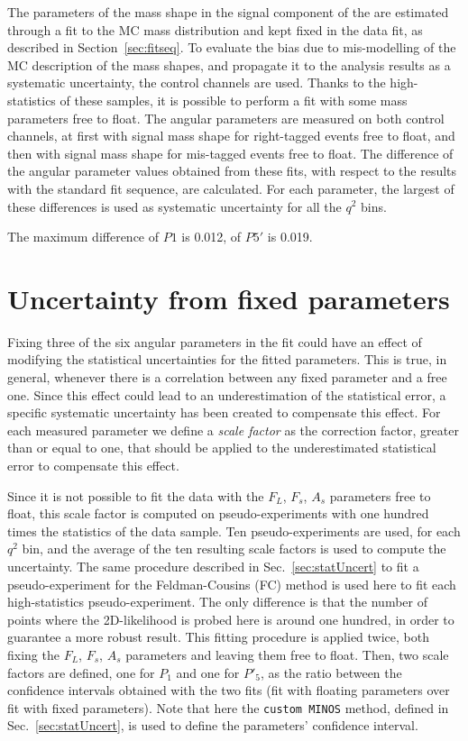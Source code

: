 The parameters of the mass shape in the signal component of the \pdf are estimated through a fit to the MC mass distribution and kept fixed in the data fit, as described in Section~\ref{sec:fitseq}.
To evaluate the bias due to mis-modelling of the MC description of the mass shapes, and propagate it to the analysis results as a systematic uncertainty, the control channels are used.
Thanks to the high-statistics of these samples, it is possible to perform a fit with some mass parameters free to float.
The angular parameters are measured on both control channels, at first with signal mass shape for right-tagged events free to float, and then with signal mass shape for mis-tagged events free to float.
The difference of the angular parameter values obtained from these fits, with respect to the results with the standard fit sequence, are calculated.
For each parameter, the largest of these differences is used as systematic uncertainty for all the $q^2$ bins.

The maximum difference of $P1$ is 0.012, of $P5'$ is 0.019.

\section{Uncertainty from fixed \pdf parameters}
\label{sec:sys-fixedparm}

Fixing three of the six angular parameters in the fit could have an effect of modifying the statistical uncertainties for the fitted parameters.
This is true, in general, whenever there is a correlation between any fixed parameter and a free one.
Since this effect could lead to an underestimation of the statistical error, a specific systematic uncertainty has been created to compensate this effect.
For each measured parameter we define a \textit{scale factor} as the correction factor, greater than or equal to one, that should be applied to the underestimated statistical error to compensate this effect. 


Since it is not possible to fit the data with the $F_L$, $F_s$, $A_s$ parameters free to float, this scale factor is computed on pseudo-experiments with one hundred times the statistics of the data sample.
Ten pseudo-experiments are used, for each $q^2$ bin, and the average of the ten resulting scale factors is used to compute the uncertainty.
The same procedure described in Sec.~\ref{sec:statUncert} to fit a pseudo-experiment for the Feldman-Cousins (FC) method is used here to fit each high-statistics pseudo-experiment.
The only difference is that the number of points where the 2D-likelihood is probed here is around one hundred, in order to guarantee a more robust result.
This fitting procedure is applied twice, both fixing the $F_L$, $F_s$, $A_s$ parameters and leaving them free to float.
Then, two scale factors are defined, one for $P_1$ and one for $P'_5$, as the ratio between the confidence intervals obtained with the two fits (fit with floating parameters over fit with fixed parameters).
Note that here the {\tt custom MINOS} method, defined in Sec.~\ref{sec:statUncert}, is used to define the parameters' confidence interval.


